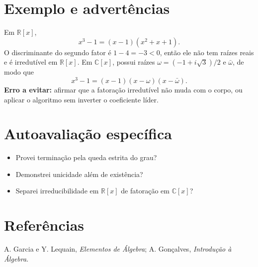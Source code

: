\documentclass[11pt,a4paper]{article}
\begin{document}
\section{Exemplo e advertências}
Em $\mathbb R[x]$,
\[
x^3-1=(x-1)(x^2+x+1).
\]
O discriminante do segundo fator é $1-4=-3<0$, então ele não tem raízes reais e é irredutível em $\mathbb R[x]$. Em $\mathbb C[x]$, possui raízes
$\omega=(-1+i\sqrt3)/2$ e $\bar\omega$, de modo que
\[
x^3-1=(x-1)(x-\omega)(x-\bar\omega).
\]
\textbf{Erro a evitar:} afirmar que a fatoração irredutível não muda com o corpo, ou aplicar o algoritmo sem inverter o coeficiente líder.
\section{Autoavaliação específica}
\begin{itemize}
\item Provei terminação pela queda estrita do grau?
\item Demonstrei unicidade além de existência?
\item Separei irreducibilidade em $\mathbb R[x]$ de fatoração em $\mathbb C[x]$?
\end{itemize}
\RubricaUFMT
\section{Referências}
A. Garcia e Y. Lequain, \emph{Elementos de Álgebra}; A. Gonçalves, \emph{Introdução à Álgebra}.
\end{document}
